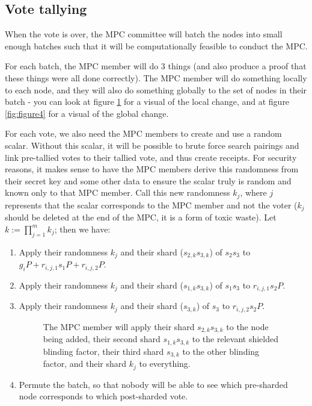 \documentclass{article}
\begin{document}
\subsection{Vote tallying}
When the vote is over, the MPC committee will batch the nodes into small enough batches such that it will be computationally feasible to conduct the MPC.

For each batch, the MPC member will do 3 things (and also produce a proof that these things were all done correctly). The MPC member will do something locally to each node, and they will also do something globally to the set of nodes in their batch - you can look at figure \ref{fig:figure3} for a visual of the local change, and at figure \ref{fig:figure4} for a visual of the global change.

For each vote, we also need the MPC members to create and use a random scalar. Without this scalar, it will be possible to brute force search pairings and link pre-tallied votes to their tallied vote, and thus create receipts. For security reasons, it makes sense to have the MPC members derive this randomness from their secret key and some other data to ensure the scalar truly is random and known only to that MPC member. Call this new randomness $k_j$, where $j$ represents that the scalar corresponds to the MPC member and not the voter ($k_j$ should be deleted at the end of the MPC, it is a form of toxic waste). Let $k:=\prod_{j=1}^{m}k_j$; then we have:
\begin{enumerate}
    \item Apply their randomness $k_j$ and their shard ($s_{2,k}s_{3,k}$) of $s_2s_3$ to $g_iP+r_{i,j,1}s_1P + r_{i,j,2}P$.
    \item Apply their randomness $k_j$ and their shard ($s_{1,k}s_{3,k}$) of $s_1s_3$ to $r_{i,j,1}s_2P$.
    \item Apply their randomness $k_j$ and their shard ($s_{3,k}$) of $s_3$ to $r_{i,j,2}s_2P$.
    \begin{figure}[h!]
        \centering
        
        \caption{The MPC member will apply their shard  $s_{2,k}s_{3,k}$ to the node being added, their second shard $s_{1,k}s_{3,k}$ to the relevant shielded blinding factor, their third shard $s_{3,k}$ to the other blinding factor, and their shard $k_j$ to everything.}
        \label{fig:figure3}
    \end{figure}
    \item Permute the batch, so that nobody will be able to see which pre-sharded node corresponds to which post-sharded vote.
\end{enumerate}
\end{document}

